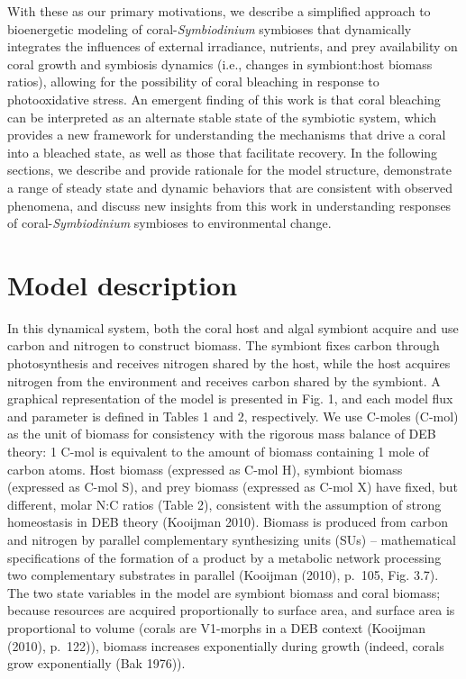 \documentclass[]{elsarticle} %
\begin{document}
With these as our primary motivations, we describe a simplified approach
to bioenergetic modeling of coral-\emph{Symbiodinium} symbioses that
dynamically integrates the influences of external irradiance, nutrients,
and prey availability on coral growth and symbiosis dynamics (i.e.,
changes in symbiont:host biomass ratios), allowing for the possibility
of coral bleaching in response to photooxidative stress. An emergent
finding of this work is that coral bleaching can be interpreted as an
alternate stable state of the symbiotic system, which provides a new
framework for understanding the mechanisms that drive a coral into a
bleached state, as well as those that facilitate recovery. In the
following sections, we describe and provide rationale for the model
structure, demonstrate a range of steady state and dynamic behaviors
that are consistent with observed phenomena, and discuss new insights
from this work in understanding responses of coral-\emph{Symbiodinium}
symbioses to environmental change.

\section{Model description}\label{model-description}

In this dynamical system, both the coral host and algal symbiont acquire
and use carbon and nitrogen to construct biomass. The symbiont fixes
carbon through photosynthesis and receives nitrogen shared by the host,
while the host acquires nitrogen from the environment and receives
carbon shared by the symbiont. A graphical representation of the model
is presented in Fig. 1, and each model flux and parameter is defined in
Tables 1 and 2, respectively. We use C-moles (C-mol) as the unit of
biomass for consistency with the rigorous mass balance of DEB theory: 1
C-mol is equivalent to the amount of biomass containing 1 mole of carbon
atoms. Host biomass (expressed as C-mol H), symbiont biomass (expressed
as C-mol S), and prey biomass (expressed as C-mol X) have fixed, but
different, molar N:C ratios (Table 2), consistent with the assumption of
strong homeostasis in DEB theory (Kooijman 2010). Biomass is produced
from carbon and nitrogen by parallel complementary synthesizing units
(SUs) -- mathematical specifications of the formation of a product by a
metabolic network processing two complementary substrates in parallel
(Kooijman (2010), p.~105, Fig. 3.7). The two state variables in the
model are symbiont biomass and coral biomass; because resources are
acquired proportionally to surface area, and surface area is
proportional to volume (corals are V1-morphs in a DEB context (Kooijman
(2010), p.~122)), biomass increases exponentially during growth (indeed,
corals grow exponentially (Bak 1976)).
\end{document}
